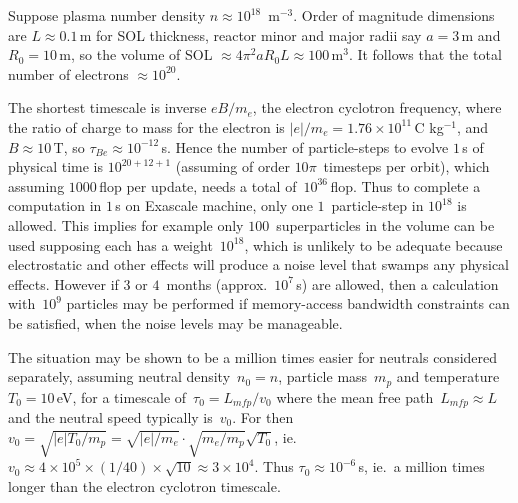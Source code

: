 
Suppose plasma number density $n \approx 10^{18}$\, m$^{-3}$. Order of magnitude
dimensions are $L\approx0.1$\,m for SOL thickness, reactor minor and major radii
say $a=3$\,m and $R_0=10$\,m, so the volume of SOL $\approx 4 \pi^2 a R_0 L \approx 100$\,m$^3$.
It follows that the total number of electrons $\approx 10^{20}$.

The shortest timescale is inverse $e B/m_e$, the electron cyclotron frequency, where the
ratio of charge to mass for the electron is
$|e|/m_e = 1.76 \times 10^{11}$\,C kg$^{-1}$, and $B\approx 10$\,T, so $\tau_{Be}\approx 10^{-12}$\,s.
Hence the number of particle-steps to evolve $1$\,s of physical time is  $10^{20+12+1}$
(assuming of order $10\pi$~timesteps per orbit),
which assuming $1000$\,flop per update, needs a total of~$10^{36}$\,flop.
Thus to complete a computation in $1$\,s on Exascale machine, only one
$1$~particle-step in $10^{18}$ is allowed.
This implies for example only $100$~superparticles in the volume can be used supposing
each has a weight~$10^{18}$, which
is unlikely to be adequate because electrostatic and other effects will produce a noise level
that swamps any physical effects. However if $3$ or $4$~months (approx.~$10^7$\,s) are allowed, then
a calculation with~$10^9$ particles may be performed if memory-access bandwidth constraints
can be satisfied, when the noise levels may be manageable.

The situation may be shown to be a million times easier for neutrals considered
separately, assuming neutral density~$n_0=n$, particle mass~$m_p$ and temperature~$T_0=10$\,eV, for a
timescale of~$\tau_{0}=L_{mfp}/v_0$ where the mean free path~$L_{mfp}\approx L$ and the neutral
speed typically is~$v_0$. For then $v_0=\sqrt{|e|T_0/m_p}
=\sqrt{|e|/m_e} \cdot \sqrt{m_e/m_p} \sqrt{T_0}$, ie.\ 
$v_{0}\approx 4 \times 10^5 \times (1/40) \times \sqrt{10}\approx 3 \times 10^4$. Thus
$\tau_0\approx 10^{-6}$\,s, ie.\  a million times longer than the electron cyclotron timescale.

